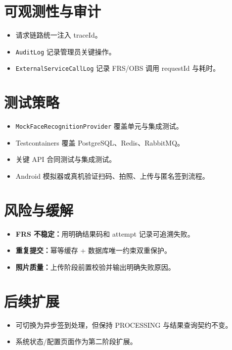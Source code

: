 \documentclass[11pt,a4paper]{ctexart}
\newcommand{\tech}[1]{\texttt{\small#1}}
\begin{document}
\section{可观测性与审计}
\begin{itemize}[leftmargin=2.5em]
  \item 请求链路统一注入 traceId。
  \item \tech{AuditLog} 记录管理员关键操作。
  \item \tech{ExternalServiceCallLog} 记录 FRS/OBS 调用 requestId 与耗时。
\end{itemize}

\section{测试策略}
\begin{itemize}[leftmargin=2.5em]
  \item \tech{MockFaceRecognitionProvider} 覆盖单元与集成测试。
  \item Testcontainers 覆盖 PostgreSQL、Redis、RabbitMQ。
  \item 关键 API 合同测试与集成测试。
  \item Android 模拟器或真机验证扫码、拍照、上传与匿名签到流程。
\end{itemize}

\section{风险与缓解}
\begin{itemize}[leftmargin=2.5em]
  \item \textbf{FRS 不稳定：}用明确结果码和 attempt 记录可追溯失败。
  \item \textbf{重复提交：}幂等缓存 + 数据库唯一约束双重保护。
  \item \textbf{照片质量：}上传阶段前置校验并输出明确失败原因。
\end{itemize}

\section{后续扩展}
\begin{itemize}[leftmargin=2.5em]
  \item 可切换为异步签到处理，但保持 PROCESSING 与结果查询契约不变。
  \item 系统状态/配置页面作为第二阶段扩展。
\end{itemize}
\end{document}
